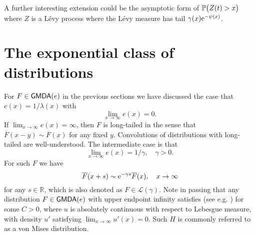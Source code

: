 A further interesting extension could be the asymptotic form of $\operatorname{{\mathbb P}}\bigl(Z(t)>x\bigr)$ where $Z$ is
a L\'evy process where the L\'evy measure has tail $\gamma(x)\mathrm{e}^{-\psi(x)}$.



\section{The exponential class of distributions}\label{C1C2}
For $F\in \mathsf{GMDA}(e)$ in the previous sections we have discussed the case that $e(x)=1/\lambda(x)$ with
	$$ \lim_{x\to \infty} e(x)= 0.$$
	If $\lim_{x\to \infty} e(x)=\infty$, then $F$ is long-tailed in the sense that
	$ \overline{F}(x- y) \sim \overline{F}(x)$ for any fixed $y$. Convolutions of distributions with long-tailed are well-understood. The intermediate case is that
	$$ \lim_{x\to \infty} e(x)= 1/\gamma, \quad \gamma>0.$$
	For such $F$ we have
	$$ 	\overline  F( x+ s) \sim \mathrm{e}^{-\gamma s} 	\overline  F(x), \quad x\to \infty$$
	for any $s\in \mathbb{R}$, which is also denoted as
	$F \in \mathcal{L}(\gamma)$.
	Note in passing that any distribution $F \in \mathsf{GMDA}(e)$ with upper endpoint infinity satisfies (see e.g. \cite[Prop.\,1.4]{resnick2013extreme})
	for some $C>0$, where $u$ is absolutely continuous with respect to Lebesgue measure, with density $u'$ satisfying  $\lim_{x\to \infty} u'(x)=0$.  Such $H$ is commonly referred to as a von Mises distribution.
	
